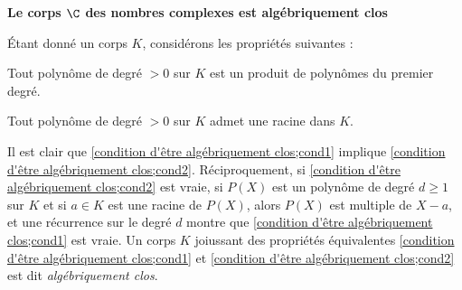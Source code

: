 \documentclass[11pt, useosf,
  title in boldface,
  theorem in new line,
  theorem numbering = section,
  number theorems separately,
]{simplivre}
\begin{document}
    \begin{center}
        \textbf{Le corps \( \C \) des nombres complexes est algébriquement clos}
    \end{center}

    Étant donné un corps \( K \), considérons les propriétés suivantes :
    \begin{enumerate-alph}
        \item \label{condition d'être algébriquement clos;cond1} Tout polynôme de degré \( > 0 \) sur \( K \) est un produit de polynômes du premier degré.
        \item \label{condition d'être algébriquement clos;cond2} Tout polynôme de degré \( > 0 \) sur \( K \) admet une racine dans \( K \).
    \end{enumerate-alph}
    Il est clair que \ref{condition d'être algébriquement clos;cond1} implique \ref{condition d'être algébriquement clos;cond2}. Réciproquement, si \ref{condition d'être algébriquement clos;cond2} est vraie, si \( P(X) \) est un polynôme de degré \( d \geqslant 1 \) sur \( K \) et si \( a \in K \) est une racine de \( P(X) \), alors \( P(X) \) est multiple de \( X-a \), et une récurrence sur le degré \( d \) montre que \ref{condition d'être algébriquement clos;cond1} est vraie. Un corps \( K \) joiussant des propriétés équivalentes \ref{condition d'être algébriquement clos;cond1} et \ref{condition d'être algébriquement clos;cond2} est dit \emph{algébriquement clos}.
\end{document}
